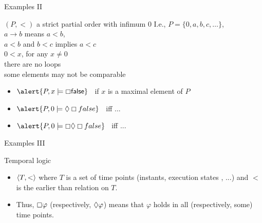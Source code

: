 \documentclass[aspectratio=169]{beamer}
\begin{document}
\begin{slide}{Examples II}\label{s:16}
\small
\begin{block}{$(P,<)$ a strict partial order with infimum $0$}
I.e., $P=\{0, a, b, c, \ldots\}$,
\\$a\to b$ means $a<b$,
\\$a<b$ and $b<c$ implies $a<c$
\\$0 < x$, for any $x\neq 0$
\\there are no loops
\\some elements may not be comparable
\\[5mm]

\begin{itemize}
\item $\alert{P, x \models \always \false}\; \;$  if $x$ is a maximal element of $P$
\item $\alert{P, 0 \models \eventual \always false}\; \;$  iff  ... %
\item $\alert{P, 0 \models \always \eventual \always false}\; \;$  iff  ... %
\end{itemize}
\end{block}
\end{slide}





\begin{slide}{Examples III}\label{s:18}
\small
\begin{block}{Temporal logic}
\begin{itemize}
\item $\langle T, < \rangle$ where $T$ is a set of time points (instants, execution states , ...) and $<$ is the \alert{earlier than} relation on $T$.
\item Thus, $\boxempty \varphi$ (respectively, $\Diamond \varphi$) means that $\varphi$ holds in all (respectively, some)  time points.
\end{itemize}
\end{block}
\end{slide}
\end{document}
